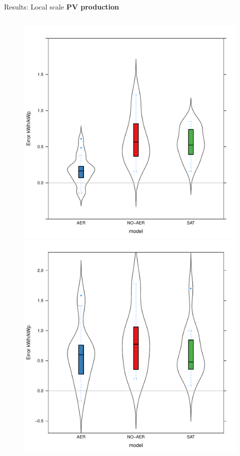 \documentclass{beamer}%
\begin{document}
\begin{frame}[fragile]{Results: Local scale}
  \textbf{PV production}\\
  \vspace{0.5\baselineskip}
  \begin{columns}
    \begin{column}{0.8\textwidth}
  \hspace{3.2\baselineskip}{Seville}
  \hspace{3.8\baselineskip}{Tarragona}
  \begin{figure}
    \includegraphics[scale=0.2]{violinplorSeville.pdf}
    \includegraphics[scale=0.2]{violinplotTarragona.pdf}

\end{figure}
\end{column}
\end{columns}
\end{frame}
\end{document}
